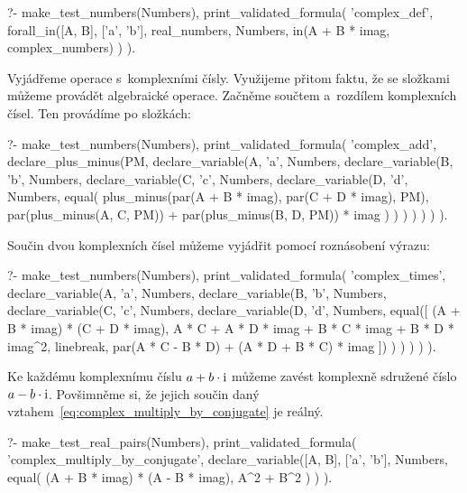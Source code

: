 \begin{fact}
\begin{prolog}
?-	make_test_numbers(Numbers),
	print_validated_formula(
		'complex_def',
		forall_in([A, B], ['a', 'b'], real_numbers, Numbers,
			in(A + B * imag, complex_numbers)
		)
	).
\end{prolog}
\end{fact}

Vyjádřeme operace s~komplexními čísly. Využijeme přitom faktu, že se složkami můžeme provádět algebraické operace. Začněme součtem a~rozdílem komplexních čísel. Ten provádíme po složkách:

\begin{prolog}
?-	make_test_numbers(Numbers),
	print_validated_formula(
		'complex_add',
		declare_plus_minus(PM,
			declare_variable(A, 'a', Numbers,
				declare_variable(B, 'b', Numbers,
					declare_variable(C, 'c', Numbers,
						declare_variable(D, 'd', Numbers,
							equal(
								plus_minus(par(A + B * imag), par(C + D * imag), PM),
								par(plus_minus(A, C, PM)) + par(plus_minus(B, D, PM)) * imag
							)
						)
					)
				)
			)
		)
	).
\end{prolog}

Součin dvou komplexních čísel můžeme vyjádřit pomocí roznásobení výrazu:

\begin{prolog}
?-	make_test_numbers(Numbers),
	print_validated_formula(
		'complex_times',
		declare_variable(A, 'a', Numbers,
			declare_variable(B, 'b', Numbers,
				declare_variable(C, 'c', Numbers,
					declare_variable(D, 'd', Numbers,
						equal([
							(A + B * imag) * (C + D * imag),
							A * C + A * D * imag + B * C * imag + B * D * imag^2,
							linebreak,
							par(A * C - B * D) + (A * D  + B * C) * imag
						])
					)
				)
			)
		)
	).
\end{prolog}

Ke každému komplexnímu číslu \(a + b \cdot \mathrm{i}\) můžeme zavést komplexně sdružené číslo \(a - b \cdot \mathrm{i}\). Povšimněme si, že jejich součin daný vztahem~\eqref{eq:complex_multiply_by_conjugate} je reálný.

\begin{prolog}
?-	make_test_real_pairs(Numbers),
	print_validated_formula(
		'complex_multiply_by_conjugate',
		declare_variable([A, B], ['a', 'b'], Numbers,
			equal(
				(A + B * imag) * (A - B * imag),
				A^2 + B^2
			)
		)
	).
\end{prolog}

